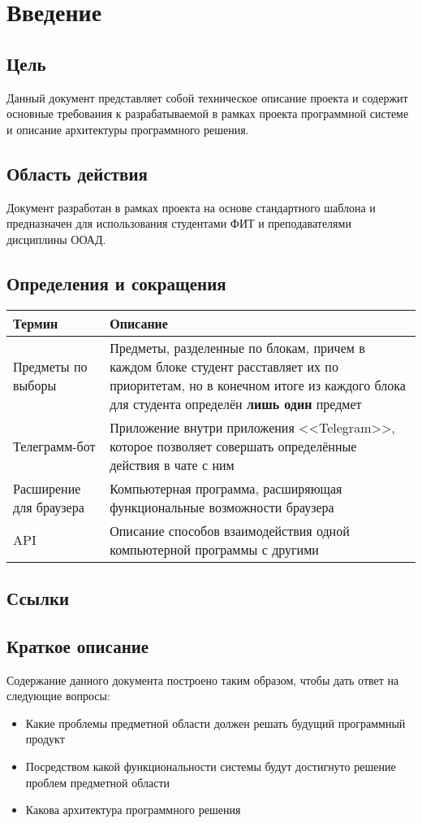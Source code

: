 \chapter{Введение}
	\label{chapter1}

	\section{Цель}
		Данный документ представляет собой техническое описание проекта \ProjectName и содержит основные требования к разрабатываемой в рамках проекта программной системе и описание архитектуры программного решения.
	\section{Область действия}
		Документ разработан в рамках проекта \ProjectName на основе стандартного шаблона и предназначен для использования студентами ФИТ и преподавателями дисциплины ООАД.
	\section{Определения и сокращения}
		\begin{tabularx}{\textwidth}{
				| >{\centering\arraybackslash\hsize=5cm}X
				| >{\centering\arraybackslash}X
				|}\hline
			\textbf{Термин} & \textbf{Описание} \\\hline
			Предметы по выборы & Предметы, разделенные по блокам, причем в каждом блоке студент расставляет их по приоритетам, но в конечном итоге из каждого блока для студента определён \textbf{лишь один} предмет \\\hline
			Телеграмм-бот & Приложение внутри приложения <<Telegram>>, которое позволяет совершать определённые действия в чате с ним \\\hline
			Расширение для браузера & Компьютерная программа, расширяющая функциональные возможности браузера \\\hline
			API & Описание способов взаимодействия одной компьютерной программы с другими \\\hline
		\end{tabularx}
	\section{Ссылки}

	\section{Краткое описание}
		Содержание данного документа построено таким образом, чтобы дать ответ на следующие вопросы:
		\begin{itemize}
			\item Какие проблемы предметной области должен решать будущий программный продукт
			
			\item Посредством какой функциональности системы будут достигнуто решение проблем предметной области
			
			\item Какова архитектура программного решения
		\end{itemize}
	
